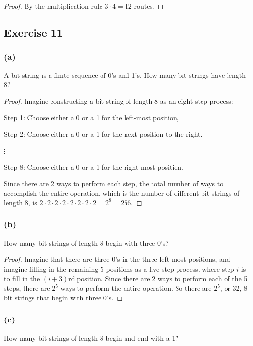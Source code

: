 \documentclass[14pt]{extarticle}
\newcommand{\cy}{\color{cyan}}
\begin{document}
\begin{proof}
By the multiplication rule \(3 \cdot 4 = 12\) routes.
\end{proof}

\subsection{Exercise 11}
\subsubsection{(a)}
A bit string is a finite sequence of 0’s and 1’s. How many bit strings have length 8?

\begin{proof}
Imagine constructing a bit string of length 8 as an eight-step process:

{\cy Step 1:} Choose either a 0 or a 1 for the left-most position,

{\cy Step 2:} Choose either a 0 or a 1 for the next position to the right.

\(\vdots\)

{\cy Step 8:} Choose either a 0 or a 1 for the right-most position.

Since there are 2 ways to perform each step, the total number of ways to accomplish the entire operation, which is 
the number of different bit strings of length 8, is \(2 \cdot 2 \cdot 2 \cdot 2 \cdot 2 \cdot 2 \cdot 2 \cdot 2 = 
2^8 = 256\).
\end{proof}

\subsubsection{(b)}
How many bit strings of length 8 begin with three 0’s?

\begin{proof}
Imagine that there are three 0’s in the three left-most positions, and imagine filling in the remaining 5 positions 
as a five-step process, where step $i$ is to fill in the \((i + 3)\)rd position. Since there are 2 ways to perform 
each of the 5 steps, there are \(2^5\) ways to perform the entire operation. So there are \(2^5\), or 32, 8-bit 
strings that begin with three 0’s.
\end{proof}

\subsubsection{(c)}
How many bit strings of length 8 begin and end with a 1?
\end{document}
